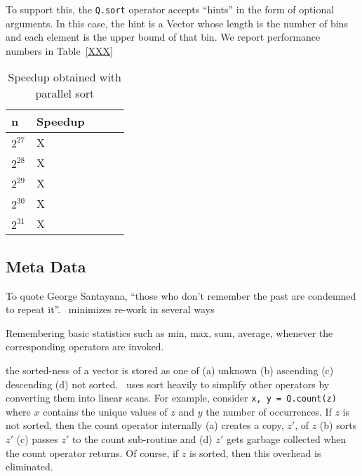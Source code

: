 To support this, the {\tt Q.sort} operator accepts ``hints'' in the form of
optional arguments. In this case, the hint is a Vector whose length is the
number of bins and each element is the upper bound of that bin. We report
performance numbers in Table~\ref{XXX}

\begin{table}
\centering
\begin{tabular}{|l|l|l|l|l|} \hline \hline
  {\bf n} & {\bf Speedup} \\ \hline \hline
  \(2^{27}\) & X \\ \hline
  \(2^{28}\) & X \\ \hline
  \(2^{29}\) & X \\ \hline
  \(2^{30}\) & X \\ \hline
  \(2^{31}\) & X \\ \hline
  \hline
\end{tabular}
\caption{Speedup obtained with parallel sort}
\label{tbl_sort_speedup}
\end{table}

\subsection{Meta Data}

To quote George Santayana, ``those who don't remember the past are condemned to
repeat it''.  \Q\ minimizes re-work in several ways
\be
\item 
Remembering basic statistics such as min, max, sum, average, whenever the
corresponding operators are invoked. 
\item the sorted-ness of a vector is
stored as one of (a) unknown (b) ascending (c) descending (d) not sorted. \Q\
uses sort heavily to simplify other operators by converting them into linear
scans. For example, consider {\tt x, y  = Q.count(z)} where \(x\) contains the
unique values of \(z\) and \(y\) the number of occurrences. If \(z\) is not
sorted, then the count operator internally (a) creates a copy, \(z'\), of \(z\)
(b) sorts \(z'\) (c) passes \(z'\) to the count sub-routine and (d) \(z'\) gets
garbage collected when the count operator returns. Of course, if \(z\) is
sorted, then this overhead is eliminated.

\ee
